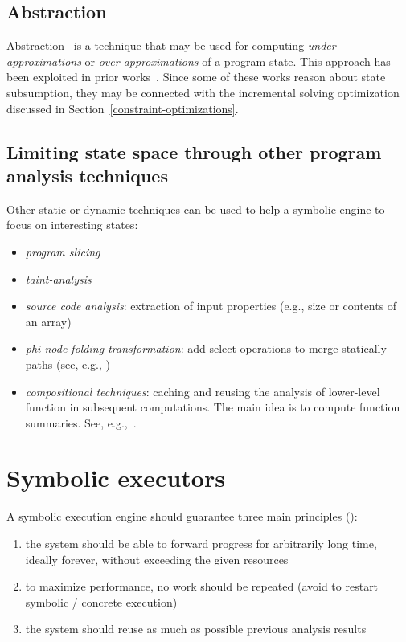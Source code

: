 \subsection{Abstraction}

Abstraction~\cite{C-SEFM07} is a technique that may be used for computing {\em under-approximations} or {\em over-approximations} of a program state. This approach has been exploited in prior works~\cite{APV-SPIN06,VPP-ISSTA06,XGM-ISSTA08}. Since some of these works reason about state subsumption, they may be connected with the incremental solving optimization discussed in Section~\ref{constraint-optimizations}.


\subsection{Limiting state space through other program analysis techniques}

Other static or dynamic techniques can be used to help a symbolic engine to focus on interesting states:
\begin{itemize}
  \item {\em program slicing}
  \item {\em taint-analysis}
  \item {\em source code analysis}: extraction of input properties (e.g., size or contents of an array)
  \item {\em phi-node folding transformation}: add select operations to merge statically paths (see, e.g., \cite{CCK-EUROSYS11})
  \item {\em compositional techniques}: caching and reusing the analysis of lower-level function in subsequent computations. The main idea is to compute function summaries. See, e.g.,~\cite{G-POPL07,G-PLDI11,MS-TR07}.
\end{itemize}


\section{Symbolic executors}

A symbolic execution engine should guarantee three main principles (\cite{MAYHEM-SP12}):
\begin{enumerate}
  \item the system should be able to forward progress for arbitrarily long time, ideally forever, without exceeding the given resources
  \item to maximize performance, no work should be repeated (avoid to restart symbolic / concrete execution)
  \item the system should reuse as much as possible previous analysis results
\end{enumerate}

